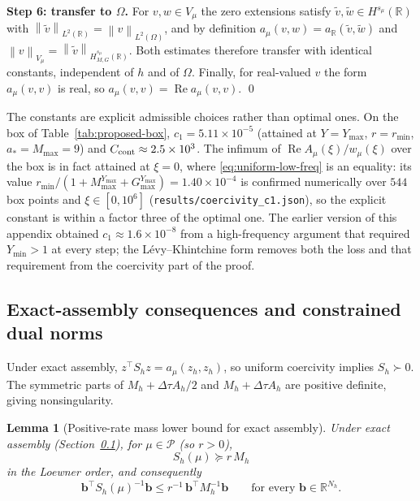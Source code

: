 \documentclass[11pt]{amsart}
\newtheorem{lemma}[theorem]{Lemma}
\theoremstyle{remark}
\newcommand{\R}{\mathbb{R}}
\newcommand{\Pset}{\mathcal{P}}
\newcommand{\Vmu}{V_{\mu}}
\newcommand{\Mh}{M_h}
\newcommand{\Ah}{A_h}
\newcommand{\Sh}{S_h}
\newcommand{\norm}[1]{\left\lVert #1\right\rVert}
\newcommand{\dt}{\Delta\tau}
\newcommand{\bb}{\mathbf b}
\newcommand{\rf}{r}
\DeclareMathOperator{\Real}{Re}
\begin{document}
\medskip\noindent
\textbf{Step 6: transfer to $\Omega$.}
For $v,w\in\Vmu$ the zero extensions satisfy
$\widetilde v,\widetilde w\in H^{s_\mu}(\R)$ with
$\norm{\widetilde v}_{L^2(\R)}=\norm{v}_{L^2(\Omega)}$, and by definition
$a_\mu(v,w)=a_\R(\widetilde v,\widetilde w)$ and
$\norm{v}_{\Vmu}=\norm{\widetilde v}_{H^{s_\mu}_{M,G}(\R)}$.  Both estimates
therefore transfer with identical constants, independent of $h$ and of
$\Omega$.  Finally, for real-valued $v$ the form $a_\mu(v,v)$ is real, so
$a_\mu(v,v)=\Real a_\mu(v,v)$.  \qed


The constants are explicit admissible choices rather than optimal ones.
On the box of Table~\ref{tab:proposed-box}, $c_1=5.11\times10^{-5}$ (attained at
$Y=Y_{\max}$, $\rf=r_{\min}$, $a_\ast=M_{\max}=9$) and $C_{\rm cont}\approx2.5\times10^3$.
The infimum of $\Real A_\mu(\xi)/w_\mu(\xi)$ over the box is in fact attained at $\xi=0$, where
\eqref{eq:uniform-low-freq} is an equality: its value $r_{\min}/(1+M_{\max}^{Y_{\max}}+G_{\max}^{Y_{\max}})
=1.40\times10^{-4}$ is confirmed numerically over $544$ box points and $\xi\in[0,10^6]$
(\texttt{results/coercivity\_c1.json}), so the explicit constant is within a factor three of the
optimal one.  The earlier version of this appendix obtained $c_1\approx1.6\times10^{-8}$ from a
high-frequency argument that required $Y_{\min}>1$ at every step; the L\'evy--Khintchine form
removes both the loss and that requirement from the coercivity part of the proof.

\subsection{Exact-assembly consequences and constrained dual norms}
\label{ssec:exact-assembly}
Under exact assembly, $z^\top\Sh z=a_\mu(z_h,z_h)$, so uniform coercivity
implies $\Sh\succ0$. The symmetric parts of $\Mh+\dt\Ah/2$ and
$\Mh+\dt\Ah$ are positive definite, giving nonsingularity.
\begin{lemma}[Positive-rate mass lower bound for exact assembly]
\label{lem:mass-lower}
Under exact assembly (Section~\ref{ssec:exact-assembly}), for
$\mu\in\Pset$ (so $\rf>0$),
\begin{equation}
  \Sh(\mu)\succeq \rf\,\Mh
  \label{eq:S-ge-rM}
\end{equation}
in the Loewner order, and consequently
\begin{equation}
  \bb^\top\Sh(\mu)^{-1}\bb\le \rf^{-1}\,\bb^\top\Mh^{-1}\bb
  \qquad\text{for every }\bb\in\R^{N_h}.
  \label{eq:mass-upper}
\end{equation}
\end{lemma}
\end{document}
